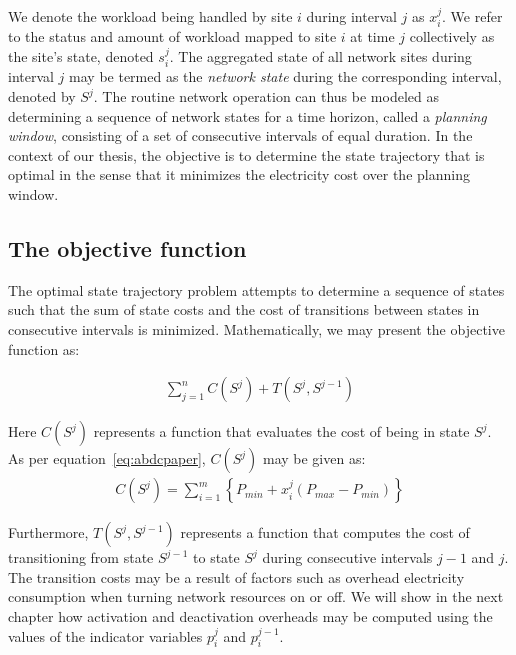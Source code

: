 We denote the workload being handled by site $i$ during interval $j$ as $x_i^j$. We refer to the status and amount of workload mapped to site $i$ at time $j$ collectively as the site's state, denoted $s_i^j$. The aggregated state of all network sites during interval $j$ may be termed as the \textit{network state} during the corresponding interval, denoted by $S^j$. The routine network operation can thus be modeled as determining a sequence of network states for a time horizon, called a \textit{planning window}, consisting of a set of consecutive intervals of equal duration. In the context of our thesis, the objective is to determine the state trajectory that is optimal in the sense that it minimizes the electricity cost over the planning window. %

\subsection{The objective function}
\label{subsec:framework:objective} %
The optimal state trajectory problem attempts to determine a sequence of states such that the sum of state costs and the cost of transitions between states in consecutive intervals is minimized. Mathematically, we may present the objective function as:

\begin{align}
\sum_{j=1}^n C(S^j) + T(S^j, S^{j-1})\label{eq:genobjective}
\end{align}

Here $C(S^j)$ represents a function that evaluates the cost of being in state $S^j$. As per equation~\ref{eq:abdcpaper}, $C(S^j)$ may be given as:
\begin{align}
C(S^j) = \sum_{i=1}^m \left\{ P_{min} + x_i^j (P_{max} - P_{min}) \right\}
\end{align}

Furthermore, $T(S^j,S^{j-1})$ represents a function that computes the cost of transitioning from state $S^{j-1}$ to state $S^j$ during consecutive intervals $j-1$ and $j$. The transition costs may be a result of factors such as overhead electricity consumption when turning network resources on or off. We will show in the next chapter how activation and deactivation overheads may be computed using the values of the indicator variables $p_i^j$ and $p_i^{j-1}$.

